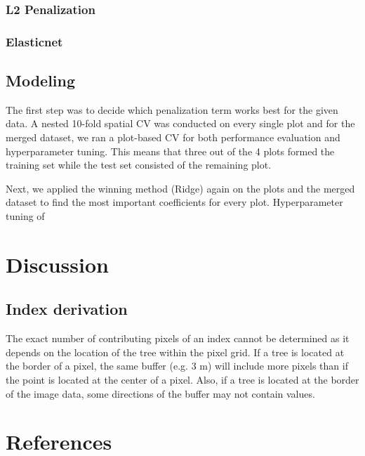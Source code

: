 \documentclass[review]{elsarticle}
\begin{document}
\subsubsection{L2 Penalization}

\subsubsection{Elasticnet}

\subsection{Modeling}

The first step was to decide which penalization term works best for the given data.
A nested 10-fold spatial \ac{CV} was conducted on every single plot and for the merged dataset, we ran a plot-based \ac{CV} for both performance evaluation and hyperparameter tuning.
This means that three out of the 4 plots formed the training set while the test set consisted of the remaining plot.

Next, we applied the winning method (Ridge) again on the plots and the merged dataset to find the most important coefficients for every plot.
Hyperparameter tuning of


\section{Discussion}

\subsection{Index derivation}

The exact number of contributing pixels of an index cannot be determined as it depends on the location of the tree within the pixel grid.
If a tree is located at the border of a pixel, the same buffer (e.g. 3 m) will include more pixels than if the point is located at the center of a pixel.
Also, if a tree is located at the border of the image data, some directions of the buffer may not contain values.

\section*{References}


\end{document}
